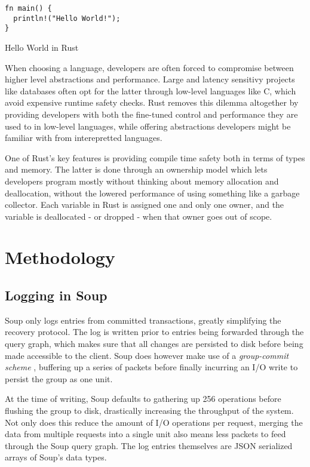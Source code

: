 \documentclass[b5paper]{report}
\begin{document}
\begin{listing}
  \begin{verbatim}
fn main() {
  println!("Hello World!");
}
  \end{verbatim}
  \caption{Hello World in Rust}
\end{listing}

When choosing a language, developers are often forced to compromise between
higher level abstractions and performance. Large and latency sensitivy projects
like databases often opt for the latter through low-level languages like C,
which avoid expensive runtime safety checks. Rust removes this dilemma
altogether by providing developers with both the fine-tuned control and
performance they are used to in low-level languages, while offering abstractions
developers might be familiar with from interepretted languages.

One of Rust's key features is providing compile time safety both in terms of
types and memory. The latter is done through an ownership model which lets
developers program mostly without thinking about memory allocation and
deallocation, without the lowered performance of using something like a garbage
collector. Each variable in Rust is assigned one and only one owner, and the
variable is deallocated - or dropped - when that owner goes out of scope.

\chapter{Methodology}

\section{Logging in Soup}
Soup only logs entries from committed transactions, greatly simplifying the
recovery protocol. The log is written prior to entries being forwarded
through the query graph, which makes sure that all changes are persisted to disk
before being made accessible to the client. Soup does however make use of a
\textit{group-commit scheme} \cite{main-memory}, buffering up a series of
packets before finally incurring an I/O write to persist the group as one unit.

At the time of writing, Soup defaults to gathering up 256 operations before
flushing the group to disk, drastically increasing the throughput of the system.
Not only does this reduce the amount of I/O operations per request, merging the
data from multiple requests into a single unit also means less packets to feed
through the Soup query graph. The log entries themselves are JSON \cite{json}
serialized arrays of Soup's data types.
\end{document}
